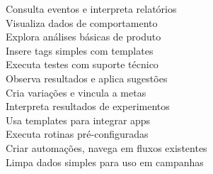 \begin{commentA}
 \footnotesize Consulta eventos e interpreta relatórios\\
 \footnotesize Visualiza dados de comportamento\\
 \footnotesize Explora análises básicas de produto\\
 \footnotesize Insere tags simples com templates\\
[0.5em]

 \footnotesize Executa testes com suporte técnico\\
 \footnotesize Observa resultados e aplica sugestões\\
 \footnotesize Cria variações e vincula a metas\\
 \footnotesize Interpreta resultados de experimentos\\
[0.5em]

 \footnotesize Usa templates para integrar apps\\
 \footnotesize Executa rotinas pré-configuradas\\
 \footnotesize Criar automações, navega em fluxos existentes\\
 \footnotesize Limpa dados simples para uso em campanhas\\
\end{commentA}
